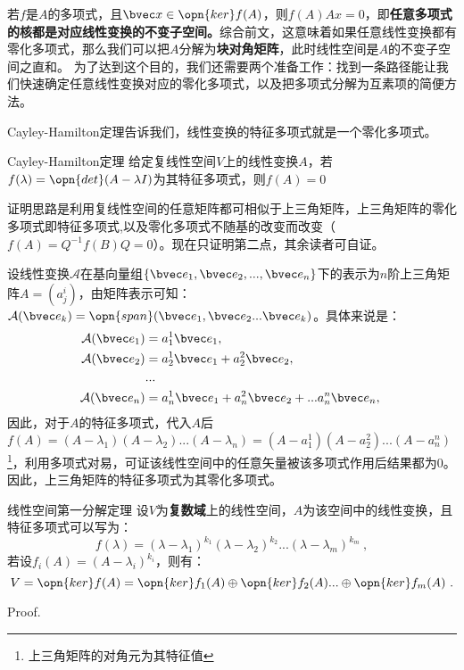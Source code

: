 若$f$是$A$的多项式，且$\bvec x\in \opn{ker}f(A)$，则$f(A)A x=0$，即\textbf{任意多项式的核都是对应线性变换的不变子空间。}综合前文，这意味着如果任意线性变换都有零化多项式，那么我们可以把$A$分解为\textbf{块对角矩阵}，此时线性空间是$A$的不变子空间之直和。
为了达到这个目的，我们还需要两个准备工作：找到一条路径能让我们快速确定任意线性变换对应的零化多项式，以及把多项式分解为互素项的简便方法。

Cayley-Hamilton定理告诉我们，线性变换的特征多项式就是一个零化多项式。
\begin{theorem}{Cayley-Hamilton定理}
给定复线性空间$V$上的线性变换$A$，若$f(\lambda)=\opn{det}(A-\lambda I)$为其特征多项式，则$f(A)=0$
\end{theorem}
证明思路是利用复线性空间的任意矩阵都可相似于上三角矩阵，上三角矩阵的零化多项式即特征多项式,以及零化多项式不随基的改变而改变（$f(A)=Q^{-1}f(B)Q=0$）。现在只证明第二点，其余读者可自证。

设线性变换$\mathcal A$在基向量组$\{\bvec e_1,\bvec e_2,...,\bvec e_n\}$下的表示为$n$阶上三角矩阵$A=(a^i_j)$，由矩阵表示可知：$\mathcal A(\bvec e_k)=\opn{span}(\bvec e_1,\bvec e_2...\bvec e_k)$。具体来说是：
\begin{equation}
\begin{aligned}
\mathcal A(\bvec e_1)&=a^1_1 \bvec e_1,\\
\mathcal A(\bvec e_2)&=a^1_2 \bvec e_1+a^2_2\bvec e_2,\\
&...\\
\mathcal A(\bvec e_n)&=a^1_n \bvec e_1+a^2_n\bvec e_2+...a^n_n\bvec e_n,\\
\end{aligned}~
\end{equation}
因此，对于$A$的特征多项式，代入$A$后$f(A)=(A-\lambda_1)(A-\lambda_2)...(A-\lambda_n)=(A-a^1_1)(A-a^2_2)...(A-a^n_n)$\footnote{上三角矩阵的对角元为其特征值}，利用多项式对易，可证该线性空间中的任意矢量被该多项式作用后结果都为$0$。因此，上三角矩阵的特征多项式为其零化多项式。
\begin{theorem}{线性空间第一分解定理}\label{the_nullpl_1}
设$V$为\textbf{复数域}上的线性空间，$A$为该空间中的线性变换，且特征多项式可以写为：
\begin{equation}
f(\lambda)=(\lambda-\lambda_1)^{k_1}(\lambda-\lambda_2)^{k_2}...(\lambda-\lambda_m)^{k_m}~,
\end{equation}
若设$f_i(A)=(A-\lambda_i)^{k_i}$，则有：
\begin{equation}
V=\opn{ker}f(A)=\opn{ker}f_1(A)\oplus\opn{ker}f_2(A)...\oplus\opn{ker}f_m(A)~.
\end{equation}
\end{theorem}
Proof.

